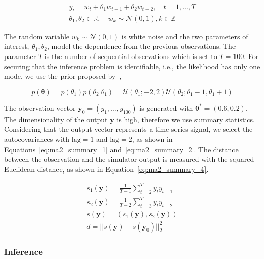 \documentclass[article, shortnames]{jss}
\newcommand{\yb}{\mathbf{y}}
\newcommand{\thetab}{\boldsymbol{\theta}}
\newcommand{\R}{\mathbb{R}}
\begin{document}
\begin{gather} \label{eq:ma2}
y_t = w_t + \theta_1 w_{t-1} + \theta_2 w_{t-2}, \quad t=1, \ldots, T\\
\theta_1, \theta_2 \in \R, \quad  w_k \sim \mathcal{N}(0,1), k \in \mathbb{Z}
\end{gather}

\noindent
The random variable \(w_{k} \sim \mathcal{N}(0,1) \) is white noise
and the two parameters of interest, \(\theta_1, \theta_2\), model the
dependence from the previous observations. The parameter \(T\) is the
number of sequential observations which is set to \(T=100\). For
securing that the inference problem is identifiable, i.e., the
likelihood has only one mode, we use the prior proposed
by~\cite{Marin2012},

\begin{equation} \label{eq:ma2_prior}
p(\thetab) = p(\theta_1)p(\theta_2|\theta_1)
= \mathcal{U}(\theta_1;-2,2)\mathcal{U}(\theta_2;\theta_1-1, \theta_1+1)
\end{equation}

\noindent
The observation vector \(\yb_0 = (y_1, \ldots, y_{100})\) is generated
with \(\thetab^*=(0.6, 0.2)\). The dimensionality of the output
\(\yb\) is high, therefore we use summary statistics. Considering that
the output vector represents a time-series signal, we select the
autocovariances with \(\mathrm{lag}=1\) and \(\mathrm{lag}=2\), as
shown in Equations~\ref{eq:ma2_summary_1}
and~\ref{eq:ma2_summary_2}. The distance between the observation and
the simulator output is measured with the squared Euclidean distance,
as shown in Equation~\ref{eq:ma2_summary_4}.

\begin{gather}
  \label{eq:ma2_summary_1} s_1(\yb) = \frac{1}{T-1} \sum_{t=2}^T y_ty_{t-1}\\
  \label{eq:ma2_summary_2} s_2(\yb) = \frac{1}{T-2} \sum_{t=3}^T y_ty_{t-2} \\
  s(\yb) = (s_1(\yb), s_2(\yb))\\
  \label{eq:ma2_summary_4} d = ||s(\yb) - s(\yb_0)||_2^2
\end{gather}

\subsubsection*{Inference}
\end{document}
